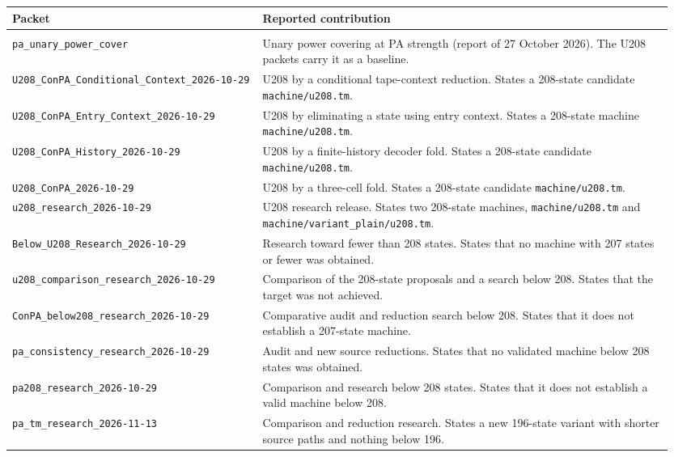 \begin{longtable}{@{}>{\raggedright\arraybackslash}p{0.36\linewidth}>{\raggedright\arraybackslash}p{0.59\linewidth}@{}}
\toprule Packet & Reported contribution\\\midrule\endhead
\multicolumn{2}{@{}l}{\textbf{Placed packets (61)}}\\\midrule
\nolinkurl{pa_unary_power_cover} & Unary power covering at PA strength (report of 27 October 2026). The U208 packets carry it as a baseline.\\[4pt]
\nolinkurl{U208_ConPA_Conditional_Context_2026-10-29} & U208 by a conditional tape-context reduction. States a 208-state candidate \nolinkurl{machine/u208.tm}.\\[4pt]
\nolinkurl{U208_ConPA_Entry_Context_2026-10-29} & U208 by eliminating a state using entry context. States a 208-state machine \nolinkurl{machine/u208.tm}.\\[4pt]
\nolinkurl{U208_ConPA_History_2026-10-29} & U208 by a finite-history decoder fold. States a 208-state candidate \nolinkurl{machine/u208.tm}.\\[4pt]
\nolinkurl{U208_ConPA_2026-10-29} & U208 by a three-cell fold. States a 208-state candidate \nolinkurl{machine/u208.tm}.\\[4pt]
\nolinkurl{u208_research_2026-10-29} & U208 research release. States two 208-state machines, \nolinkurl{machine/u208.tm} and \nolinkurl{machine/variant_plain/u208.tm}.\\[4pt]
\nolinkurl{Below_U208_Research_2026-10-29} & Research toward fewer than 208 states. States that no machine with 207 states or fewer was obtained.\\[4pt]
\nolinkurl{u208_comparison_research_2026-10-29} & Comparison of the 208-state proposals and a search below 208. States that the target was not achieved.\\[4pt]
\nolinkurl{ConPA_below208_research_2026-10-29} & Comparative audit and reduction search below 208. States that it does not establish a 207-state machine.\\[4pt]
\nolinkurl{pa_consistency_research_2026-10-29} & Audit and new source reductions. States that no validated machine below 208 states was obtained.\\[4pt]
\nolinkurl{pa208_research_2026-10-29} & Comparison and research below 208 states. States that it does not establish a valid machine below 208.\\[4pt]
\nolinkurl{pa_tm_research_2026-11-13} & Comparison and reduction research. States a new 196-state variant with shorter source paths and nothing below 196.\\[4pt]

\end{longtable}
